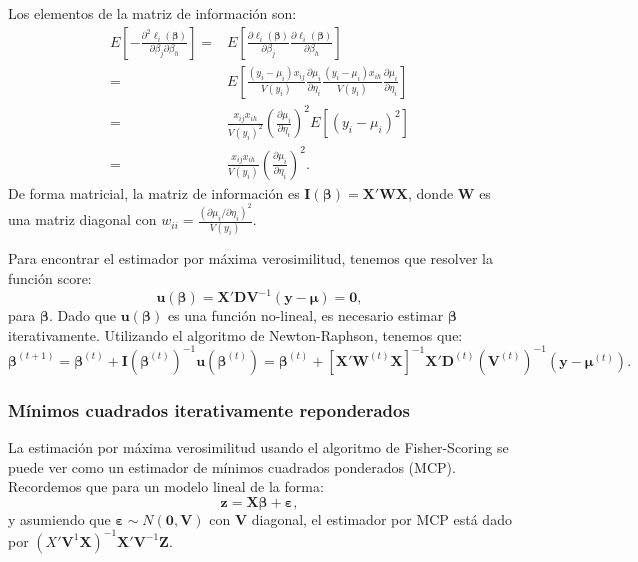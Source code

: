 \documentclass[
]{article}
\begin{document}
Los elementos de la matriz de información son:
\[
\begin{split}
E\left[ - \frac{\partial^{2}\ell_{i}(\boldsymbol \beta)}{\partial \beta_{j}\partial\beta_{h}} \right] =& E\left[ \frac{\partial\ell_{i}(\boldsymbol \beta)}{\partial \beta_{j}} \frac{\partial\ell_{i}(\boldsymbol \beta)}{\partial \beta_{h}} \right] \\
=& E\left[ \frac{(y_{i}-\mu_{i})x_{ij}}{V(y_{i})}\frac{\partial \mu_{i}}{\partial \eta_{i}} \frac{(y_{i}-\mu_{i})x_{ih}}{V(y_{i})}\frac{\partial \mu_{i}}{\partial \eta_{i}} \right]  \\
=& \frac{x_{ij}x_{ih}}{V(y_{i})^{2}}\left( \frac{\partial \mu_{i}}{\partial \eta_{i}} \right)^{2} E\left[ (y_{i}-\mu_{i})^2 \right] \\
=& \frac{x_{ij}x_{ih}}{V(y_{i})}\left( \frac{\partial \mu_{i}}{\partial \eta_{i}} \right)^{2}.
\end{split}
\]
De forma matricial, la matriz de información es \(\boldsymbol I(\boldsymbol \beta) = \boldsymbol X'\boldsymbol W\boldsymbol X\), donde \(\boldsymbol W\) es una matriz diagonal con \(w_{ii} = \frac{(\partial \mu_{i}/\partial \eta_{i})^{2}}{V(y_{i})}\).

Para encontrar el estimador por máxima verosimilitud, tenemos que resolver la función score:
\[
\boldsymbol u(\boldsymbol \beta) = \boldsymbol X'\boldsymbol D\boldsymbol V^{-1}(\boldsymbol y- \boldsymbol \mu) = \boldsymbol 0,
\]
para \(\boldsymbol \beta\). Dado que \(\boldsymbol u(\boldsymbol \beta)\) es una función no-lineal, es necesario estimar \(\boldsymbol \beta\) iterativamente. Utilizando el algoritmo de Newton-Raphson, tenemos que:
\[
\boldsymbol \beta^{(t+1)} = \boldsymbol \beta^{(t)} + \boldsymbol I\left(\boldsymbol \beta^{(t)}\right)^{-1}\boldsymbol u(\boldsymbol \beta^{(t)}) = \boldsymbol \beta^{(t)} + \left[ \boldsymbol X'\boldsymbol W^{(t)}\boldsymbol X\right]^{-1}\boldsymbol X'\boldsymbol D^{(t)}\left(\boldsymbol V^{(t)}\right)^{-1}(\boldsymbol y-\boldsymbol \mu^{(t)}).
\]

\subsubsection{Mínimos cuadrados iterativamente reponderados}\label{muxednimos-cuadrados-iterativamente-reponderados}

La estimación por máxima verosimilitud usando el algoritmo de Fisher-Scoring se puede ver como un estimador de mínimos cuadrados ponderados (MCP). Recordemos que para un modelo lineal de la forma:
\[
\boldsymbol z= \boldsymbol X\boldsymbol \beta+ \boldsymbol \varepsilon,
\]
y asumiendo que \(\boldsymbol \varepsilon\sim N(\boldsymbol 0,\boldsymbol V)\) con \(\boldsymbol V\) diagonal, el estimador por MCP está dado por \((X'\boldsymbol V^{1}\boldsymbol X)^{-1}\boldsymbol X'\boldsymbol V^{-1}\boldsymbol Z\).
\end{document}
